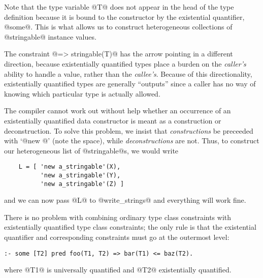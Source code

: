 Note that the type variable @T@ does not appear in the head of the type
definition because it is bound to the constructor by the existential
quantifier, @some@.  This is what allows us to construct heterogeneous
collections of @stringable@ instance values.

The constraint @=> stringable(T)@ has the arrow pointing in a different
direction, because existentially quantified types place a burden on the
\emph{caller's} ability to handle a value, rather than the
\emph{callee's}.  Because of this directionality, existentially
quantified types are generally ``outputs'' since a caller has no way of
knowing which particular type is actually allowed.

The compiler cannot work out without help  whether an occurrence of an existentially
quantified data constructor is meant as a construction or
deconstruction.  To solve this problem, we insist that
\emph{constructions} be preceeded with `@new @' (note the space), while
\emph{deconstructions} are not.  Thus, to construct our heterogeneous
list of @stringable@s, we would write
\begin{verbatim}
    L = [ 'new a_stringable'(X),
          'new a_stringable'(Y),
          'new a_stringable'(Z) ]
\end{verbatim}
and we can now pass @L@ to @write_strings@ and everything will work
fine.

There is no problem with combining ordinary type class constraints with
existentially quantified type class constraints; the only rule is that
the existential quantifier and corresponding constraints must go at the
outermost level:
\begin{verbatim}
:- some [T2] pred foo(T1, T2) => bar(T1) <= baz(T2).
\end{verbatim}
where @T1@ is universally quantified and @T2@ existentially quantified.

